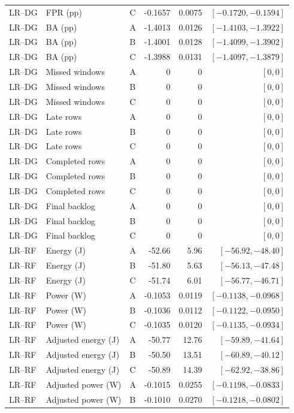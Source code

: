 \begin{longtable}{lllrrr}
LR--DG & FPR (pp) & C & -0.1657 & 0.0075 & $[-0.1720,-0.1594]$\\
LR--DG & BA (pp) & A & -1.4013 & 0.0126 & $[-1.4103,-1.3922]$\\
LR--DG & BA (pp) & B & -1.4001 & 0.0128 & $[-1.4099,-1.3902]$\\
LR--DG & BA (pp) & C & -1.3988 & 0.0131 & $[-1.4097,-1.3879]$\\
LR--DG & Missed windows & A & 0 & 0 & $[0,0]$\\
LR--DG & Missed windows & B & 0 & 0 & $[0,0]$\\
LR--DG & Missed windows & C & 0 & 0 & $[0,0]$\\
LR--DG & Late rows & A & 0 & 0 & $[0,0]$\\
LR--DG & Late rows & B & 0 & 0 & $[0,0]$\\
LR--DG & Late rows & C & 0 & 0 & $[0,0]$\\
LR--DG & Completed rows & A & 0 & 0 & $[0,0]$\\
LR--DG & Completed rows & B & 0 & 0 & $[0,0]$\\
LR--DG & Completed rows & C & 0 & 0 & $[0,0]$\\
LR--DG & Final backlog & A & 0 & 0 & $[0,0]$\\
LR--DG & Final backlog & B & 0 & 0 & $[0,0]$\\
LR--DG & Final backlog & C & 0 & 0 & $[0,0]$\\
LR--RF & Energy (J) & A & -52.66 & 5.96 & $[-56.92,-48.40]$\\
LR--RF & Energy (J) & B & -51.80 & 5.63 & $[-56.13,-47.48]$\\
LR--RF & Energy (J) & C & -51.74 & 6.01 & $[-56.77,-46.71]$\\
LR--RF & Power (W) & A & -0.1053 & 0.0119 & $[-0.1138,-0.0968]$\\
LR--RF & Power (W) & B & -0.1036 & 0.0112 & $[-0.1122,-0.0950]$\\
LR--RF & Power (W) & C & -0.1035 & 0.0120 & $[-0.1135,-0.0934]$\\
LR--RF & Adjusted energy (J) & A & -50.77 & 12.76 & $[-59.89,-41.64]$\\
LR--RF & Adjusted energy (J) & B & -50.50 & 13.51 & $[-60.89,-40.12]$\\
LR--RF & Adjusted energy (J) & C & -50.89 & 14.39 & $[-62.92,-38.86]$\\
LR--RF & Adjusted power (W) & A & -0.1015 & 0.0255 & $[-0.1198,-0.0833]$\\
LR--RF & Adjusted power (W) & B & -0.1010 & 0.0270 & $[-0.1218,-0.0802]$\\

\end{longtable}
